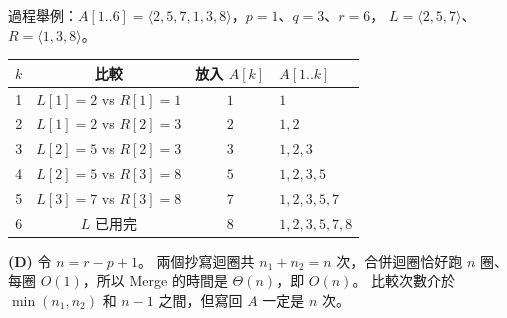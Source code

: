 \begin{pastsoln}
過程舉例：$A[1..6] = \langle 2, 5, 7, 1, 3, 8\rangle$，$p = 1$、$q = 3$、$r = 6$，
$L = \langle 2, 5, 7\rangle$、$R = \langle 1, 3, 8\rangle$。
\begin{center}
\begin{tabular}{cccl}
\toprule
$k$ & 比較 & 放入 $A[k]$ & $A[1..k]$ \\
\midrule
1 & $L[1] = 2$ vs $R[1] = 1$ & $1$ & $1$ \\
2 & $L[1] = 2$ vs $R[2] = 3$ & $2$ & $1, 2$ \\
3 & $L[2] = 5$ vs $R[2] = 3$ & $3$ & $1, 2, 3$ \\
4 & $L[2] = 5$ vs $R[3] = 8$ & $5$ & $1, 2, 3, 5$ \\
5 & $L[3] = 7$ vs $R[3] = 8$ & $7$ & $1, 2, 3, 5, 7$ \\
6 & $L$ 已用完 & $8$ & $1, 2, 3, 5, 7, 8$ \\
\bottomrule
\end{tabular}
\end{center}

\textbf{(D)} 令 $n = r - p + 1$。 兩個抄寫迴圈共 $n_1 + n_2 = n$ 次，合併迴圈恰好跑 $n$ 圈、每圈
$O(1)$，所以 Merge 的時間是 $\Theta(n)$，即 $O(n)$。 比較次數介於 $\min(n_1, n_2)$ 和 $n - 1$
之間，但寫回 $A$ 一定是 $n$ 次。
\end{pastsoln}
